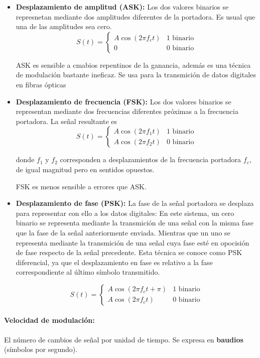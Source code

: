 \begin{itemize}
  \item \textbf{Desplazamiento de amplitud (ASK):} Los dos valores binarios se represnetan mediante dos amplitudes diferentes de la portadora. Es usual que una de las amplitudes sea cero.
  \[
    S(t) = \begin{cases}
      A\cos(2\pi f_c t) & \text{1 binario} \\
      0 & \text{0 binario}
    \end{cases}
  \]

  ASK es sensible a cmabios repentinos de la ganancia, además es una técnica de modulación bastante ineficaz. Se usa para la transmición de datos digitales en fibras ópticas
  \item  \textbf{Desplazamiento de frecuencia (FSK):} Los dos valores binarios se representan mediante dos frecuencias diferentes próximas a la frecuencia portadora. La señal resultante es
  \[
    S(t) = \begin{cases}
      A\cos(2\pi f_1 t) & \text{1 binario} \\
      A\cos(2\pi f_2 t) & \text{0 binario}
    \end{cases}
  \]
  
  donde \(f_1\) y \(f_2\) corresponden a desplazamientos de la frecuencia portadora \(f_c\), de igual magnitud pero en sentidos opuestos.

  FSK es menos sensible a errores que ASK.
  \item  \textbf{Desplazamiento de fase (PSK):} La fase de la señal portadora se desplaza para representar con ello a los datos digitales: En este sistema, un cero binario se representa mediante la transmición de una señal con la misma fase que la fase de la señal anteriormente enviada. Mientras que un uno se representa mediante la transmición de una señal cuya fase esté en opocisión de fase respecto de la señal precedente. Esta técnica se conoce como PSK diferencial, ya que el desplazamiento en fase es relativo a la fase correspondiente al último símbolo transmitido.
  
  \[
    S(t) = \begin{cases}
      A\cos(2\pi f_c t + \pi) & \text{1 binario} \\
      A\cos(2\pi f_c t) & \text{0 binario}
    \end{cases}
  \]
\end{itemize}

\paragraph{Velocidad de modulación:} El número de cambios de señal por unidad de tiempo. Se expresa en \textbf{baudios} (símbolos por segundo).

